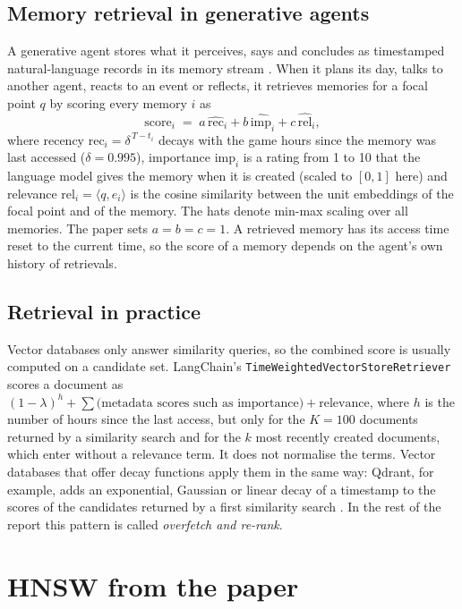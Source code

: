 \documentclass[11pt,a4paper]{article}
\newcommand{\code}[1]{\texttt{#1}}
\newcommand{\rec}{\mathrm{rec}}
\newcommand{\imp}{\mathrm{imp}}
\newcommand{\rel}{\mathrm{rel}}
\begin{document}
\subsection{Memory retrieval in generative agents}

A generative agent stores what it perceives, says and concludes as timestamped natural-language records in its memory stream \citep{park2023generative}. When it plans its day, talks to another agent, reacts to an event or reflects, it retrieves memories for a focal point $q$ by scoring every memory $i$ as
\begin{equation}
\mathrm{score}_i \;=\; a\,\widehat{\rec}_i + b\,\widehat{\imp}_i + c\,\widehat{\rel}_i ,
\label{eq:score}
\end{equation}
where recency $\rec_i=\delta^{\,T-t_i}$ decays with the game hours since the memory was last accessed ($\delta=0.995$), importance $\imp_i$ is a rating from 1 to 10 that the language model gives the memory when it is created (scaled to $[0,1]$ here) and relevance $\rel_i=\langle q,e_i\rangle$ is the cosine similarity between the unit embeddings of the focal point and of the memory. The hats denote min-max scaling over all memories. The paper sets $a=b=c=1$. A retrieved memory has its access time reset to the current time, so the score of a memory depends on the agent's own history of retrievals.

\subsection{Retrieval in practice}

Vector databases only answer similarity queries, so the combined score is usually computed on a candidate set. LangChain's \code{TimeWeightedVectorStoreRetriever} \citep{langchain_twr} scores a document as $(1-\lambda)^{h} + \sum \text{(metadata scores such as importance)} + \text{relevance}$, where $h$ is the number of hours since the last access, but only for the $K=100$ documents returned by a similarity search and for the $k$ most recently created documents, which enter without a relevance term. It does not normalise the terms. Vector databases that offer decay functions apply them in the same way: Qdrant, for example, adds an exponential, Gaussian or linear decay of a timestamp to the scores of the candidates returned by a first similarity search \citep{qdrant_decay}. In the rest of the report this pattern is called \emph{overfetch and re-rank}.

\section{HNSW from the paper}
\label{sec:hnsw}
\end{document}
